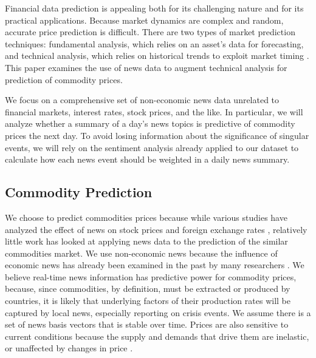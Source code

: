 Financial data prediction is appealing both for its challenging nature and for its practical applications. Because market dynamics are complex and random, accurate price prediction is difficult. There are two types of market prediction techniques: fundamental analysis, which relies on an asset's data for forecasting, and technical analysis, which relies on historical trends to exploit market timing \cite{schumaker2009textual}. This paper examines the use of news data to augment technical analysis for prediction of commodity prices.

We focus on a comprehensive set of non-economic news data unrelated to financial markets, interest rates, stock prices, and the like. In particular, we will analyze whether a summary of a day's news topics is predictive of commodity prices the next day. To avoid losing information about the significance of singular events, we will rely on the sentiment analysis already applied to our dataset to calculate how each news event should be weighted in a daily news summary.

\subsection{Commodity Prediction}
We choose to predict commodities prices because while various studies have analyzed the effect of news on stock prices \cite{mcqueen1993stock} and foreign exchange rates \cite{kamruzzaman2003svm}, relatively little work has looked at applying news data to the prediction of the similar commodities market. We use non-economic news because the influence of economic news has already been examined in the past by many researchers \cite{gidofalvi2001using}\cite{schumaker2009textual}\cite{bollen2011twitter}\cite{hagenau2012automated}. We believe real-time news information has predictive power for commodity prices, because, since commodities, by definition, must be extracted or produced by countries, it is likely that underlying factors of their production rates will be captured by local news, especially reporting on crisis events. We assume there is a set of news basis vectors that is stable over time. %
Prices are also sensitive to current conditions because the supply and demands that drive them are inelastic, or unaffected by changes in price \cite{chen2008can}. 

